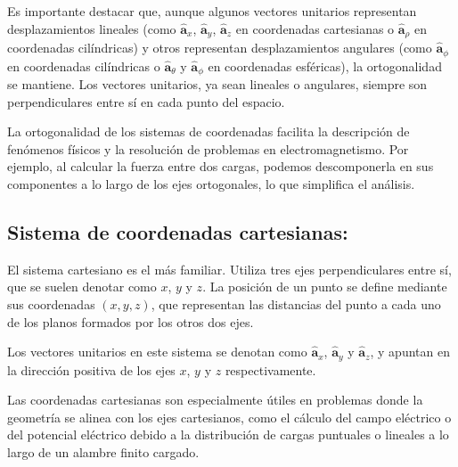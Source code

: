 \documentclass{book}
\begin{document}
Es importante destacar que, aunque algunos vectores unitarios representan desplazamientos lineales (como $\mathbf{\hat{a}}_x$, $\mathbf{\hat{a}}_y$, $\mathbf{\hat{a}}_z$ en coordenadas cartesianas o  $\mathbf{\hat{a}}_\rho$ en coordenadas cilíndricas) y otros representan desplazamientos angulares (como $\mathbf{\hat{a}}_\phi$ en coordenadas cilíndricas o $\mathbf{\hat{a}}_\theta$ y $\mathbf{\hat{a}}_\phi$ en coordenadas esféricas), la ortogonalidad se mantiene. Los vectores unitarios, ya sean lineales o angulares, siempre son perpendiculares entre sí en cada punto del espacio.

La ortogonalidad de los sistemas de coordenadas facilita la descripción de fenómenos físicos y la resolución de problemas en electromagnetismo. Por ejemplo, al calcular la fuerza entre dos cargas, podemos descomponerla en sus componentes a lo largo de los ejes ortogonales, lo que simplifica el análisis.

\subsection{Sistema de coordenadas cartesianas:}

El sistema cartesiano es el más familiar. Utiliza tres ejes perpendiculares entre sí, que se suelen denotar como $x$, $y$ y $z$. La posición de un punto se define mediante sus coordenadas $(x, y, z)$, que representan las distancias del punto a cada uno de los planos formados por los otros dos ejes.

Los vectores unitarios en este sistema se denotan como $\mathbf{\hat{a}}_x$, $\mathbf{\hat{a}}_y$ y $\mathbf{\hat{a}}_z$, y apuntan en la dirección positiva de los ejes $x$, $y$ y $z$ respectivamente.

Las coordenadas cartesianas son especialmente útiles en problemas donde la geometría se alinea con los ejes cartesianos, como el cálculo del campo eléctrico o del potencial eléctrico debido a la distribución de cargas puntuales o lineales a lo largo de un alambre finito cargado.
 
\end{document}
